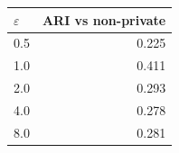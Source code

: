 \begin{tabular}{lr}
\toprule
$\varepsilon$ & ARI vs non-private \\
\midrule
0.5 & 0.225 \\
1.0 & 0.411 \\
2.0 & 0.293 \\
4.0 & 0.278 \\
8.0 & 0.281 \\
\bottomrule
\end{tabular}
